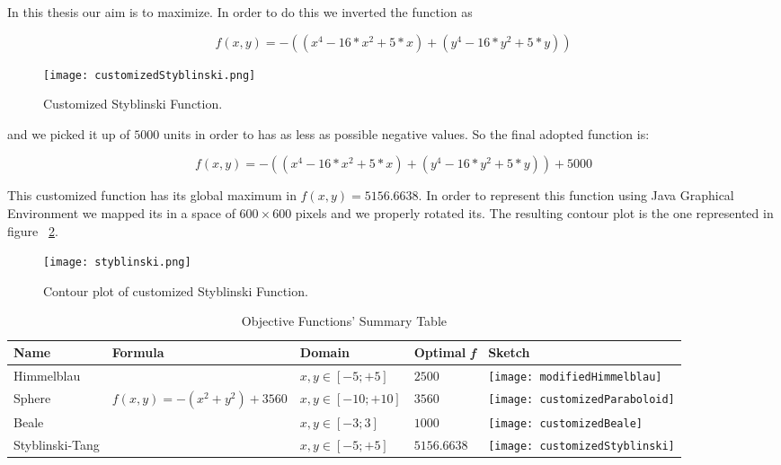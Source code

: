 In this thesis our aim is to maximize. In order to do this we inverted the function as

\begin{equation}
f(x, y) = -((x^4 - 16 * x^2 + 5 * x) + (y^4 - 16 * y^2 + 5 * y))
\end{equation}

\begin{figure}[h!]
	\centering
	\texttt{[image: customizedStyblinski.png]}
	\caption{Customized Styblinski Function.}
	\label{fig:CustomizedStyblinskiFunction}
\end{figure}

and we picked it up of $5000$ units in order to has as less as possible negative values. So the final adopted function is: 

\begin{equation}
f(x, y) = -((x^4 - 16 * x^2 + 5 * x) + (y^4 - 16 * y^2 + 5 * y)) + 5000
\end{equation}

This customized function has its global maximum in $f(x, y) = 5156.6638$. In order to represent this function using Java Graphical Environment we mapped its in a space of $600 \times 600$ pixels and we properly rotated its. The resulting contour plot is the one represented in figure ~\ref{fig:ContourStyblinskiFunction}.

\pagebreak

\begin{figure}[h!]
	\centering
	\texttt{[image: styblinski.png]}
	\caption{Contour plot of customized Styblinski Function.}
	\label{fig:ContourStyblinskiFunction}
\end{figure}
	
\begin{sidewaystable} 
	\centering
	\caption{Objective Functions'  Summary Table}
	\begin{tabular}
		{l l l l l} \hline Name & Formula & Domain & Optimal \textit{f} & Sketch \\
		\hline Himmelblau & \vtop{\hbox{\strut $f(x, y) = - ((x^2 + y -11)^2+$}\hbox{\strut $+(x + y^2 - 7)^2) + 2500$}} & $x, y \in [-5;+5]$ & $2500$ & \parbox[c]{1em}{
			\texttt{[image: modifiedHimmelblau]}} \\
		Sphere & $f(x, y) = -(x^2 + y^2) + 3560$ &$x, y \in [-10;+10]$ & $3560$ & \parbox[c]{1em}{
			\texttt{[image: customizedParaboloid]}} \\
		Beale &  &$x, y \in [-3;3]$ & $1000$ & \parbox[c]{1em}{
			\texttt{[image: customizedBeale]}} \\
		Styblinski-Tang &  &$x, y \in [-5;+5]$ & $5156.6638$ & \parbox[c]{1em}{
			\texttt{[image: customizedStyblinski]}} \\
		\hline
	\end{tabular}
\end{sidewaystable}

